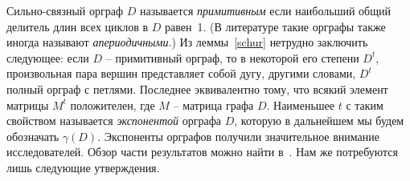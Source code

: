 \documentclass[11pt]{article}
\begin{document}

Сильно-связный орграф $D$ называется \emph{примитивным} если наибольший общий
делитель длин всех циклов в $D$ равен~1. (В литературе такие орграфы также
иногда называют \emph{апериодичными}.)
Из леммы~\ref{schur} нетрудно заключить следующее: если $D$ -- примитивный
орграф, то в некоторой его степени $D^t$, произвольная пара вершин представляет
собой дугу, другими словами, $D^t$ полный орграф с петлями. Последнее эквивалентно тому,
что всякий элемент матрицы $M^t$ положителен, где $M$ -- матрица графа $D$.
Наименьшее $t$ с таким свойством называется \emph{экспонентой} орграфа $D$, которую 
в дальнейшем мы будем обозначать $\gamma(D)$. Экспоненты орграфов получили значительное 
внимание исследователей. Обзор части результатов можно найти в~\cite{Br}.
Нам же потребуются лишь следующие утверждения.

\end{document}
